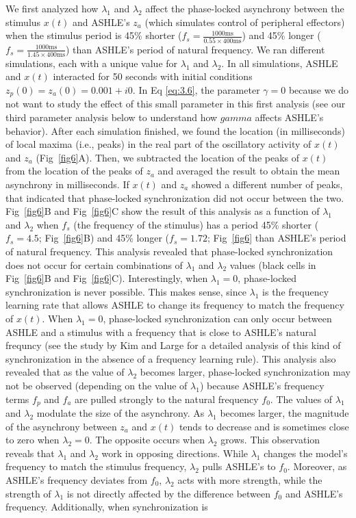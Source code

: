 \documentclass[10pt,letterpaper]{article}
\begin{document}
We first analyzed how $\lambda_1$ and $\lambda_2$ affect the phase-locked asynchrony between the stimulus $x(t)$ and ASHLE's $z_a$ (which simulates control of peripheral effectors) when the stimulus period is 45\% shorter ($f_s = \frac{1000\text{ms}}{0.55 \times 400\text{ms}}$) and 45\% longer ($f_s = \frac{1000\text{ms}}{1.45 \times 400\text{ms}}$) than ASHLE's period of natural frequency. We ran different simulations, each with a unique value for $\lambda_1$ and $\lambda_2$. In all simulations, ASHLE and $x(t)$ interacted for 50 seconds with initial conditions $z_p(0)=z_a(0)=0.001 + i0$. In Eq \eqref{eq:3.6}, the parameter $\gamma=0$ because we do not want to study the effect of this small parameter in this first analysis (see our third parameter analysis below to understand how $gamma$ affects ASHLE's behavior). After each simulation finished, we found the location (in milliseconds) of local maxima (i.e., peaks) in the real part of the oscillatory activity of $x(t)$ and $z_a$ (Fig~\ref{fig6}A). Then, we subtracted the location of the peaks of $x(t)$ from the location of the peaks of $z_a$ and averaged the result to obtain the mean asynchrony in milliseconds. If $x(t)$ and $z_a$ showed a different number of peaks, that indicated that phase-locked synchronization did not occur between the two. Fig~\ref{fig6}B and Fig~\ref{fig6}C show the result of this analysis as a function of $\lambda_1$ and $\lambda_2$ when $f_s$ (the frequency of the stimulus) has a period 45\% shorter ($f_s = 4.5$; Fig~\ref{fig6}B) and 45\% longer ($f_s = 1.72$; Fig~\ref{fig6} than ASHLE's period of natural frequency. This analysis revealed that phase-locked synchronization does not occur for certain combinations of $\lambda_1$ and $\lambda_2$ values (black cells in Fig~\ref{fig6}B and Fig~\ref{fig6}C). Interestingly, when $\lambda_1=0$, phase-locked synchronization is never possible. This makes sense, since $\lambda_1$ is the frequency learning rate that allows ASHLE to change its frequency to match the frequency of $x(t)$. When $\lambda_1=0$, phase-locked synchronization can only occur between ASHLE and a stimulus with a frequency that is close to ASHLE's natural frequncy (see the study by Kim and Large \cite{kim2015signal} for a detailed analysis of this kind of synchronization in the absence of a frequency learning rule). This analysis also revealed that as the value of $\lambda_2$ becomes larger, phase-locked synchronization may not be observed (depending on the value of $\lambda_1$) because ASHLE's frequency terms $f_p$ and $f_a$ are pulled strongly to the natural frequency $f_0$. The values of $\lambda_1$ and $\lambda_2$ modulate the size of the asynchrony. As $\lambda_1$ becomes larger, the magnitude of the asynchrony between $z_a$ and $x(t)$ tends to decrease and is sometimes close to zero when $\lambda_2=0$. The opposite occurs when $\lambda_2$ grows. This observation reveals that $\lambda_1$ and $\lambda_2$ work in opposing directions. While $\lambda_1$ changes the model's frequency to match the stimulus frequency, $\lambda_2$ pulls ASHLE's to $f_0$. Moreover, as ASHLE's frequency deviates from $f_0$, $\lambda_2$ acts with more strength, while the strength of $\lambda_1$ is not directly affected by the difference between $f_0$ and ASHLE's frequency. Additionally, when synchronization is 
\end{document}
